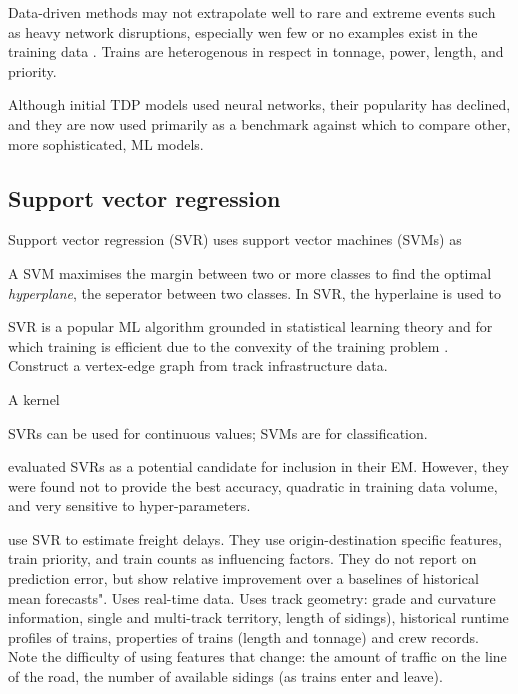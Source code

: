 \documentclass{article}
\begin{document}
Data-driven methods may not extrapolate well to rare and extreme events such as heavy network disruptions, especially wen few or no examples exist in the training data \cite{barbour_et_al_2019}.
Trains are heterogenous in respect in tonnage, power, length, and priority. 


Although initial TDP models used neural networks, their popularity has declined, and they are now used primarily as a benchmark against which to compare other, more sophisticated, ML models.


\subsection{Support vector regression}

Support vector regression (SVR) uses support vector machines (SVMs) as

A SVM maximises the margin between two or more classes to find the optimal \textit{hyperplane}, the seperator between two classes. In SVR, the hyperlaine is used to 

SVR is a popular ML algorithm grounded in statistical learning theory and for which training is efficient due to the convexity of the training problem \cite{barbour_et_al_2019}.
Construct a vertex-edge graph from track infrastructure data. 

A kernel 

SVRs can be used for continuous values; SVMs are for classification.

\cite{nair_et_al_2019} evaluated SVRs as a potential candidate for inclusion in their EM. However, they were found not to provide the best accuracy, quadratic in training data volume, and very sensitive to hyper-parameters.

\cite{barbour_et_al_2018} use SVR to estimate freight delays. They use origin-destination specific features, train priority, and train counts as influencing factors. They do not report on prediction error, but show relative improvement over a baselines of historical mean forecasts". Uses real-time data. Uses track geometry: grade and curvature information, single and multi-track territory, length of sidings), historical runtime profiles of trains, properties of trains (length and tonnage) and crew records. Note the difficulty of using features that change: the amount of traffic on the line of the road, the number of available sidings (as trains enter and leave).
\end{document}
